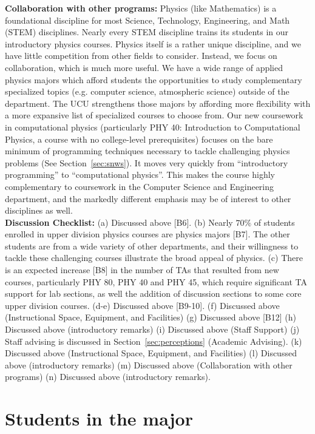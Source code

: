 \documentclass[12pt]{article}
\begin{document}
\noindent
{\bf Collaboration with other programs: } Physics (like Mathematics)
is a foundational discipline for most Science, Technology,
Engineering, and Math (STEM) disciplines.  Nearly every STEM
discipline trains its students in our introductory physics courses.
Physics itself is a rather unique discipline, and we have little
competition from other fields to consider.  Instead, we focus on
collaboration, which is much more useful.  We have a wide range of
applied physics majors which afford students the opportunities to
study complementary specialized topics (e.g. computer science,
atmospheric science) outside of the department.  The UCU strengthens
those majors by affording more flexibility with a more expansive list
of specialized courses to choose from.  Our new coursework in
computational physics (particularly PHY 40: Introduction to
Computational Physics, a course with no college-level prerequisites)
focuses on the bare minimum of programming techniques necessary to
tackle challenging physics problems (See Section~\ref{sec:snws}).  It
moves very quickly from ``introductory programming'' to
``computational physics''.  This makes the course highly complementary
to coursework in the Computer Science and Engineering department, and the markedly different emphasis may be of interest to other disciplines as well.\\[3pt]

\noindent
{\bf Discussion Checklist:} (a) Discussed above [B6].  (b)
Nearly $70\%$ of students enrolled in upper division physics courses are physics majors [B7].  The other students are from a wide variety of other departments, and their willingness to tackle these challenging courses illustrate  the broad appeal of physics. (c) There is an expected
increase [B8] in the number of TAs that resulted from new courses,
particularly PHY 80, PHY 40 and PHY 45, which require significant TA
support for lab sections, as well the addition of discussion sections
to some core upper division courses.  (d-e) Discussed above
[B9-10]. (f) Discussed above (Instructional Space, Equipment, and
Facilities) (g) Discussed above [B12] (h) Discussed above (introductory remarks) (i) Discussed above (Staff
Support) (j) Staff advising is discussed in
Section~\ref{sec:perceptions} (Academic Advising).  (k) Discussed
above (Instructional Space, Equipment, and Facilities) (l)
Discussed above (introductory remarks) (m) Discussed above
(Collaboration with other programs) (n) Discussed above (introductory remarks).

\section{Students in the major}
\label{sec:students}
\end{document}
